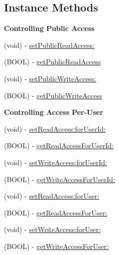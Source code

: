 \subsection*{Instance Methods}
\begin{Indent}{\bf Controlling Public Access}\par
{\em 

 

 }\begin{DoxyCompactItemize}
\item 
(void) -\/ \hyperlink{interface_p_f_a_c_l_a07a9d5eb83422dc60defe00f0a065ac8}{set\+Public\+Read\+Access\+:}
\item 
(B\+O\+O\+L) -\/ \hyperlink{interface_p_f_a_c_l_a6cfead99d7b2d6dbfeb5c0adff02e77c}{get\+Public\+Read\+Access}
\item 
(void) -\/ \hyperlink{interface_p_f_a_c_l_a03f7243b08a550559ae302dd59fb19af}{set\+Public\+Write\+Access\+:}
\item 
(B\+O\+O\+L) -\/ \hyperlink{interface_p_f_a_c_l_a7c4c01986370e522801938f33c00aa9b}{get\+Public\+Write\+Access}
\end{DoxyCompactItemize}
\end{Indent}
\begin{Indent}{\bf Controlling Access Per-\/\+User}\par
{\em 

 

 }\begin{DoxyCompactItemize}
\item 
(void) -\/ \hyperlink{interface_p_f_a_c_l_ab07fc67985c4192d98687ee4506c3f7d}{set\+Read\+Access\+:for\+User\+Id\+:}
\item 
(B\+O\+O\+L) -\/ \hyperlink{interface_p_f_a_c_l_ab6007a4ff90412ba96d2cb747ac00608}{get\+Read\+Access\+For\+User\+Id\+:}
\item 
(void) -\/ \hyperlink{interface_p_f_a_c_l_a220cde1f59e7686b437e49a48098b7af}{set\+Write\+Access\+:for\+User\+Id\+:}
\item 
(B\+O\+O\+L) -\/ \hyperlink{interface_p_f_a_c_l_aa7531e1a18602d291c3be1185d4d32df}{get\+Write\+Access\+For\+User\+Id\+:}
\item 
(void) -\/ \hyperlink{interface_p_f_a_c_l_a922fd610d717721028053de889bf2206}{set\+Read\+Access\+:for\+User\+:}
\item 
(B\+O\+O\+L) -\/ \hyperlink{interface_p_f_a_c_l_a899d76874d7995405bb4a7144dbb3217}{get\+Read\+Access\+For\+User\+:}
\item 
(void) -\/ \hyperlink{interface_p_f_a_c_l_a0e7e1dfd5eef9031fed403f897dfc450}{set\+Write\+Access\+:for\+User\+:}
\item 
(B\+O\+O\+L) -\/ \hyperlink{interface_p_f_a_c_l_ab34333f902c3da04f5937d3ca84838a0}{get\+Write\+Access\+For\+User\+:}
\end{DoxyCompactItemize}
\end{Indent}
